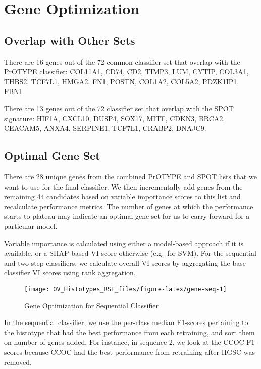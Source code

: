 \documentclass[
]{report}
\begin{document}
\hypertarget{gene-optimization}{%
\section{Gene Optimization}\label{gene-optimization}}

\hypertarget{overlap-with-other-sets}{%
\subsection{Overlap with Other Sets}\label{overlap-with-other-sets}}

There are 16 genes out of the 72 common classifier set that overlap with the PrOTYPE classifier: COL11A1, CD74, CD2, TIMP3, LUM, CYTIP, COL3A1, THBS2, TCF7L1, HMGA2, FN1, POSTN, COL1A2, COL5A2, PDZK1IP1, FBN1

There are 13 genes out of the 72 classifier set that overlap with the SPOT signature: HIF1A, CXCL10, DUSP4, SOX17, MITF, CDKN3, BRCA2, CEACAM5, ANXA4, SERPINE1, TCF7L1, CRABP2, DNAJC9.

\hypertarget{optimal-gene-set}{%
\subsection{Optimal Gene Set}\label{optimal-gene-set}}

There are 28 unique genes from the combined PrOTYPE and SPOT lists that we want to use for the final classifier. We then incrementally add genes from the remaining 44 candidates based on variable importance scores to this list and recalculate performance metrics. The number of genes at which the performance starts to plateau may indicate an optimal gene set for us to carry forward for a particular model.

Variable importance is calculated using either a model-based approach if it is available, or a SHAP-based VI score otherwise (e.g.~for SVM). For the sequential and two-step classifiers, we calculate overall VI scores by aggregating the base classifier VI scores using rank aggregation.

\begin{figure}[H]

{\centering \texttt{[image: OV\_Histotypes\_RSF\_files/figure-latex/gene-seq-1]} 

}

\caption{Gene Optimization for Sequential Classifier}\label{fig:gene-seq}
\end{figure}

In the sequential classifier, we use the per-class median F1-scores pertaining to the histotype that had the best performance from each retraining, and sort them on number of genes added. For instance, in sequence 2, we look at the CCOC F1-scores because CCOC had the best performance from retraining after HGSC was removed.
\end{document}
